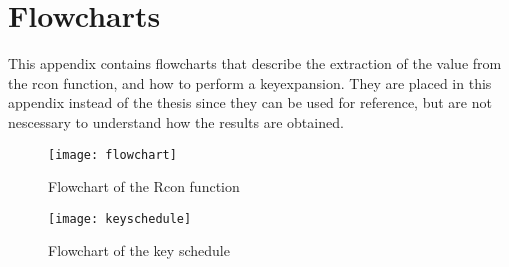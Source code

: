 \chapter{Flowcharts} \label{app:fig}
This appendix contains flowcharts that describe the extraction of the 
value from the rcon function, and how to perform a keyexpansion.
They are placed in this appendix instead of the thesis since they 
can be used for reference, but are not nescessary to understand how 
the results are obtained.

\begin{figure}
  \begin{center}
    \texttt{[image: flowchart]}
  \end{center}
  \caption{Flowchart of the Rcon function}
  \label{img:rcon}
\end{figure}

\begin{figure}
  \texttt{[image: keyschedule]}
  \caption{Flowchart of the key schedule}
  \label{img:keysch}
\end{figure}


